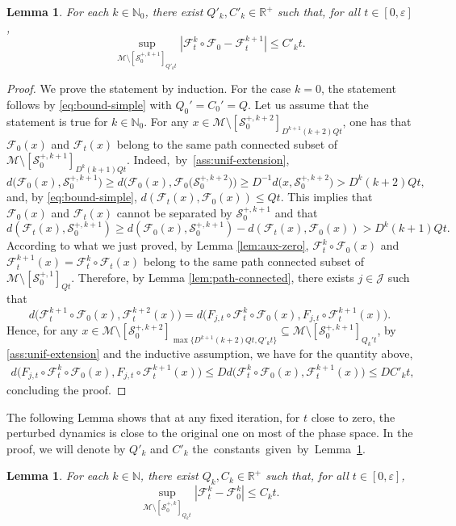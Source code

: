 \documentclass{amsart}
\numberwithin{equation}{section}
\newtheorem{lemma}[theorem]{Lemma}
\newcommand\ve{\varepsilon}
\renewcommand{\ge}{\geqslant}
\renewcommand{\le}{\leqslant}
\newcommand\cF{{\mathcal F}}
\newcommand\cJ{{\mathcal J}}
\newcommand\cM{{\mathcal M}}
\newcommand\cS{{\mathcal S}}
\newcommand\bN{{\mathbb N}}
\newcommand\bR{{\mathbb R}}
\begin{document}
\begin{lemma}\label{lem:aux}
For each \(k \in \bN_0\), there exist \(Q'_k, C'_k \in \bR^+\) such that, for all \(t \in [0,\ve]\),
\[
    \sup_{\cM \setminus [\cS_0^{+,k+1}  ]_{Q'_k t} } \left|\cF^k_t \circ \cF_0 - \cF^{k+1}_t\right|\le C'_k t.
\]
\end{lemma}
\begin{proof}
We prove the statement by induction. For the case \(k = 0\), the statement follows by \eqref{eq:bound-simple} with \(Q_0' = C_0' = Q\). Let us assume that the statement is true for \(k \in \bN_0\). For any \(x \in \cM \setminus [\cS_0^{+,k+2}]_{ D^{k+1}(k+2) Q t}\), one has that \(\cF_0(x)\) and \(\cF_t(x)\) belong to the same path connected subset of \(\cM \setminus [\cS_0^{+,k+1}]_{ D^{k}(k+1) Q t}\). \mbox{Indeed, by \ref{ass:unif-extension},} 
\[
d\bigl(\cF_0(x), \cS_0^{+,k+1}\bigr) \ge d\bigl(\cF_0(x), \cF_0 \bigl(\cS_0^{+,k+2}\bigr)\bigr) \ge D^{-1}d\bigl(x, \cS_{0}^{+,k+2}\bigr) > D^{k}(k+2) Q t,
\]
and, by \eqref{eq:bound-simple}, \(d(\cF_t(x), \cF_0(x)) \le Qt\). This implies that \(\cF_0(x)\) and \(\cF_t(x)\) cannot be separated by \(\cS_0^{+, k+1}\) and that
\[
    d (\cF_t(x), \cS_0^{+,k+1}) \ge d(\cF_0(x), \cS_0^{+,k+1}) - d(\cF_t(x), \cF_0(x)) >  D^k(k+1)Qt.
\] 
According to what we just proved, by Lemma \ref{lem:aux-zero}, \(\cF^k_t \circ \cF_0 (x)\) and \(\cF_t^{k+1}(x) = \cF^k_t \circ \cF_t (x)\) belong to the same path connected subset of \(\cM \setminus [\cS_0^{+,1}]_{Q t}\).
Therefore, by Lemma \ref{lem:path-connected}, there exists \(j \in \cJ\) such that 
\[
    d\bigl( \cF_t^{k+1} \circ \cF_0(x), \cF_t^{k+2}(x) \bigr) =  d\bigl(F_{j,t}\circ\cF_t^{k} \circ \cF_0(x) , F_{j,t}\circ \cF_t^{k+1} (x) \bigr).
\]
Hence, for any \(x \in \cM \setminus [\cS_0^{+, k+2}]_{\max \{ D^{k+1}(k+2) Q t, Q'_k t\}} \subseteq \cM \setminus [\cS_0^{+, k+1}]_{Q_k' t}\),  by \ref{ass:unif-extension} and the inductive assumption, we have for the quantity above,
\[
\begin{split}
   d\bigl(F_{j,t}\circ\cF_t^{k} \circ \cF_0(x) , F_{j,t}\circ \cF_t^{k+1} (x) \bigr)  \le D d\bigl(\cF_t^{k} \circ \cF_0(x) , \cF_t^{k+1}(x)\bigr) \le D C'_{k}t,
\end{split}
\]
concluding the proof.
\end{proof}
The following Lemma shows that at any fixed iteration, for \(t\) close to zero, the perturbed dynamics is close to the original one on most of the phase space. In the proof, we will denote by \(Q'_k\) and \(C'_k\) \mbox{the constants given by Lemma \ref{lem:aux}.}
\begin{lemma}
  \label{lem:n-map-sing}
 For each \(k \in \bN\), there exist \(Q_k, C_k \in \bR^+\) such that, for all \(t \in [0,\ve]\),
\[
     \sup_{\cM \setminus [\cS_0^{+,k}  ]_{Q_k t}} \left|\cF^k_t - \cF^k_0\right|\le C_k t.
\]
\end{lemma}
\end{document}
